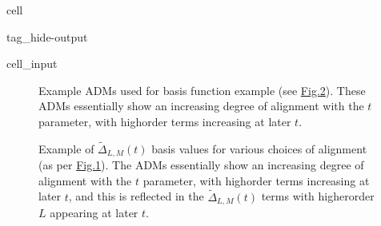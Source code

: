 \documentclass[letterpaper,table,10pt,english]{jupyterBook}
\begin{document}
\begin{sphinxuseclass}{cell}
\begin{sphinxuseclass}{tag_hide-output}
\begin{sphinxVerbatimInput}
\begin{sphinxuseclass}{cell_input}
\begin{sphinxVerbatim}[commandchars=\\\{\}]
  
  
\end{sphinxVerbatim}

\end{sphinxuseclass}\end{sphinxVerbatimInput}

\end{sphinxuseclass}
\end{sphinxuseclass}
\begin{figure}[htbp]
\centering
\capstart

\noindent{}
\caption{Example ADMs used for {\hyperref[\detokenize{backmatter/glossary:term-AF}]{}} basis function example (see \hyperref[\detokenize{part1/theory_tensor_formalism_160723:fig-afterm-linearramp}]{Fig.\@ \ref{\detokenize{part1/theory_tensor_formalism_160723:fig-afterm-linearramp}}}). These ADMs essentially show an increasing degree of alignment with the \(t\) parameter, with high\sphinxhyphen{}order terms increasing at later \(t\).}\label{\detokenize{part1/theory_tensor_formalism_160723:fig-adms-linearramp}}\end{figure}

\begin{figure}[htbp]
\centering
\capstart

\noindent{}
\caption{Example of \(\tilde{\Delta}_{L,M}(t)\) basis values for various choices of alignment (as per \hyperref[\detokenize{part1/theory_tensor_formalism_160723:fig-adms-linearramp}]{Fig.\@ \ref{\detokenize{part1/theory_tensor_formalism_160723:fig-adms-linearramp}}}). The ADMs essentially show an increasing degree of alignment with the \(t\) parameter, with high\sphinxhyphen{}order terms increasing at later \(t\), and this is reflected in the \(\tilde{\Delta}_{L,M}(t)\) terms with higher\sphinxhyphen{}order \(L\) appearing at later \(t\).}\label{\detokenize{part1/theory_tensor_formalism_160723:fig-afterm-linearramp}}\end{figure}
\end{document}
